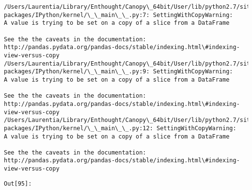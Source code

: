 \documentclass{article}
\begin{document}
    \begin{Verbatim}[commandchars=\\\{\}]
/Users/Laurentia/Library/Enthought/Canopy\_64bit/User/lib/python2.7/site-packages/IPython/kernel/\_\_main\_\_.py:7: SettingWithCopyWarning: 
A value is trying to be set on a copy of a slice from a DataFrame

See the the caveats in the documentation: http://pandas.pydata.org/pandas-docs/stable/indexing.html\#indexing-view-versus-copy
/Users/Laurentia/Library/Enthought/Canopy\_64bit/User/lib/python2.7/site-packages/IPython/kernel/\_\_main\_\_.py:9: SettingWithCopyWarning: 
A value is trying to be set on a copy of a slice from a DataFrame

See the the caveats in the documentation: http://pandas.pydata.org/pandas-docs/stable/indexing.html\#indexing-view-versus-copy
/Users/Laurentia/Library/Enthought/Canopy\_64bit/User/lib/python2.7/site-packages/IPython/kernel/\_\_main\_\_.py:12: SettingWithCopyWarning: 
A value is trying to be set on a copy of a slice from a DataFrame

See the the caveats in the documentation: http://pandas.pydata.org/pandas-docs/stable/indexing.html\#indexing-view-versus-copy
    \end{Verbatim}
\texttt{\color{outcolor}Out[{\color{outcolor}95}]:}
    
\end{document}
